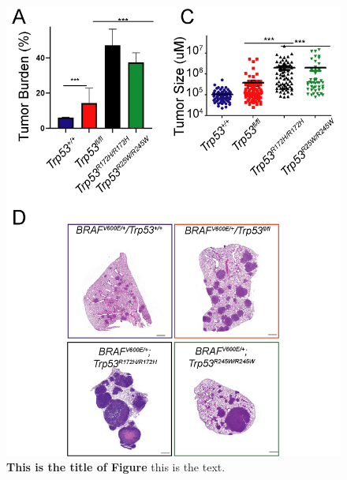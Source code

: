 \begin{figure}
\hypertarget{fig:04}{%
\centering
\includegraphics[width=1\textwidth,height=\textheight]{images/p53_2.png}
\caption{\textbf{This is the title of Figure} this is the text.}\label{fig:04}
}
\end{figure}

